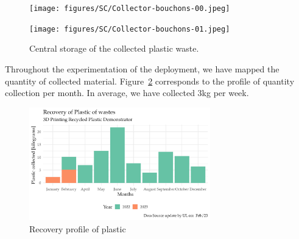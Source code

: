 \documentclass[
  11pt,
]{article}
\begin{document}
\begin{figure}

\begin{minipage}[b]{0.50\linewidth}

{\centering 

\texttt{[image: figures/SC/Collector-bouchons-00.jpeg]}

}

\end{minipage}%
%
\begin{minipage}[b]{0.50\linewidth}

{\centering 

\texttt{[image: figures/SC/Collector-bouchons-01.jpeg]}

}

\end{minipage}%

\caption{\label{fig-sc-collector}Central storage of the collected
plastic waste.}

\end{figure}

Throughout the experimentation of the deployment, we have mapped the
quantity of collected material. Figure~\ref{fig-sc-recovery} corresponds
to the profile of quantity collection per month. In average, we have
collected 3kg per week.

\begin{figure}[H]

{\centering \includegraphics[width=0.7\textwidth,height=\textheight]{figures/SC/Recovery.jpg}

}

\caption{\label{fig-sc-recovery}Recovery profile of plastic}

\end{figure}
\end{document}
